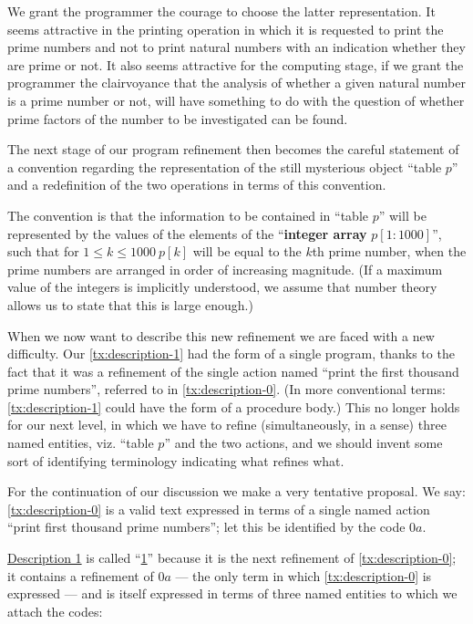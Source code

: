 We grant the programmer the courage to choose the latter representation. It seems attractive in the printing operation in which it is requested to print the prime numbers and not to print natural numbers with an indication whether they are prime or not. It also seems attractive for the computing stage, if we grant the programmer the clairvoyance that the analysis of whether a given natural number is a prime number or not, will have something to do with the question of whether prime factors of the number to be investigated can be found.

The next stage of our program refinement then becomes the careful statement of a convention regarding the representation of the still mysterious object ``table $p$'' and a redefinition of the two operations in terms of this convention.

The convention is that the information to be contained in ``table $p$'' will be represented by the values of the elements of the ``\textbf{integer array} $p[1 : 1000]$'', such that for $1 \leqslant k \leqslant 1000\ p[k]$ will be equal to the $k$th prime number, when the prime numbers are arranged in order of increasing magnitude. (If a maximum value of the integers is implicitly understood, we assume that number theory allows us to state that this is large enough.)

When we now want to describe this new refinement we are faced with a new difficulty. Our \ref{tx:description-1} had the form of a single program, thanks to the fact that it was a refinement of the single action named ``print the first thousand prime numbers'', referred to in \ref{tx:description-0}. (In more conventional terms: \ref{tx:description-1} could have the form of a procedure body.) This no longer holds for our next level, in which we have to refine (simultaneously, in a sense) three named entities, viz. ``table $p$'' and the two actions, and we should invent some sort of identifying terminology indicating what refines what.

For the continuation of our discussion we make a very tentative proposal. We say: \ref{tx:description-0} is a valid text expressed in terms of a single named action ``print first thousand prime numbers''; let this be identified by the code $0a$.

\hyperref[tx:description-1]{Description 1} is called ``\hyperref[tx:description-1]{1}'' because it is the next refinement of \ref{tx:description-0}; it contains a refinement of $0a$ --- the only term in which \ref{tx:description-0} is expressed --- and is itself expressed in terms of three named entities to which we attach the codes:

